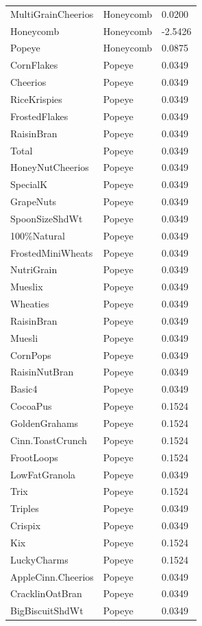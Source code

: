 \begin{table}[!htbp]
\begin{tabular}{lll}
MultiGrainCheerios & Honeycomb & 0.0200
\\
Honeycomb & Honeycomb & -2.5426
\\
Popeye & Honeycomb & 0.0875
\\
CornFlakes & Popeye & 0.0349
\\
Cheerios & Popeye & 0.0349
\\
RiceKrispies & Popeye & 0.0349
\\
FrostedFlakes & Popeye & 0.0349
\\
RaisinBran & Popeye & 0.0349
\\
Total & Popeye & 0.0349
\\
HoneyNutCheerios & Popeye & 0.0349
\\
SpecialK & Popeye & 0.0349
\\
GrapeNuts & Popeye & 0.0349
\\
SpoonSizeShdWt & Popeye & 0.0349
\\
100\%Natural & Popeye & 0.0349
\\
FrostedMiniWheats & Popeye & 0.0349
\\
NutriGrain & Popeye & 0.0349
\\
Mueslix & Popeye & 0.0349
\\
Wheaties & Popeye & 0.0349
\\
RaisinBran & Popeye & 0.0349
\\
Muesli & Popeye & 0.0349
\\
CornPops & Popeye & 0.0349
\\
RaisinNutBran & Popeye & 0.0349
\\
Basic4 & Popeye & 0.0349
\\
CocoaPus & Popeye & 0.1524
\\
GoldenGrahams & Popeye & 0.1524
\\
Cinn.ToastCrunch & Popeye & 0.1524
\\
FrootLoops & Popeye & 0.1524
\\
LowFatGranola & Popeye & 0.0349
\\
Trix & Popeye & 0.1524
\\
Triples & Popeye & 0.0349
\\
Crispix & Popeye & 0.0349
\\
Kix & Popeye & 0.1524
\\
LuckyCharms & Popeye & 0.1524
\\
AppleCinn.Cheerios & Popeye & 0.0349
\\
CracklinOatBran & Popeye & 0.0349
\\
BigBiscuitShdWt & Popeye & 0.0349
\\

\end{tabular}
\end{table}
